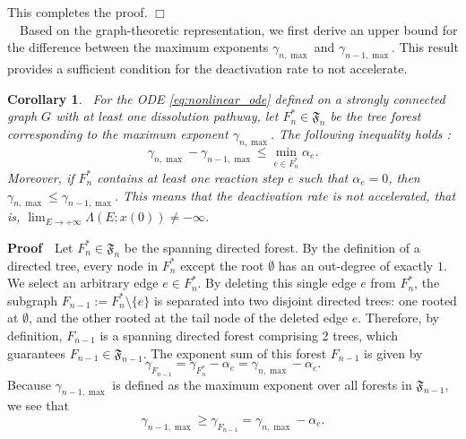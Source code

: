 \documentclass[11pt,a4paper]{article}
\newtheorem{coll}{Corollary}[section]
\begin{document}
This completes the proof. \hfill $\Box$\\[0.2cm]
~~Based on the graph-theoretic representation, we first derive an upper bound for the difference between the maximum exponents $\gamma_{n, \max}$ and $\gamma_{n-1, \max}$. This result provides a sufficient condition for the deactivation rate to not accelerate.
\begin{coll}~For the ODE \eqref{eq:nonlinear_ode} defined on a strongly connected graph $G$ with at least one dissolution pathway, let $F_n^* \in \mathfrak{F}_n$ be the tree forest corresponding to the maximum exponent $\gamma_{n, \max}$. The following inequality holds :
\begin{equation}
\gamma_{n, \max} - \gamma_{n-1, \max} \le \min_{e \in F_n^*} \alpha_e. \label{eq:universal_bound}
\end{equation}
Moreover, if $F_n^*$ contains at least one reaction step $e$ such that $\alpha_e = 0$, then $\gamma_{n, \max} \le \gamma_{n-1, \max}$. This means that the deactivation rate is not accelerated, that is, $\lim_{E \to +\infty}\Lambda(E;x(0)) \not = -\infty$.
\end{coll}
\noindent
{\bf Proof}~~Let $F_n^* \in \mathfrak{F}_n$ be the spanning directed forest. By the definition of a directed tree, every node in $F_n^*$ except the root $\emptyset$ has an out-degree of exactly $1$. We select an arbitrary edge $e \in F_n^*$. By deleting this single edge $e$ from $F_n^*$, the subgraph $F_{n-1} := F_n^* \setminus \{e\}$ is separated into two disjoint directed trees: one rooted at $\emptyset$, and the other rooted at the tail node of the deleted edge $e$. Therefore, by definition, $F_{n-1}$ is a spanning directed forest comprising 2 trees, which guarantees $F_{n-1} \in \mathfrak{F}_{n-1}$. The exponent sum of this forest $F_{n-1}$ is given by
\begin{equation}
\gamma_{F_{n-1}} = \gamma_{F_n^*} - \alpha_e = \gamma_{n, \max} - \alpha_e.
\end{equation}
Because $\gamma_{n-1, \max}$ is defined as the maximum exponent over all forests in $\mathfrak{F}_{n-1}$, we see that
\begin{equation}
\gamma_{n-1, \max} \ge \gamma_{F_{n-1}} = \gamma_{n, \max} - \alpha_e.
\end{equation}
\end{document}
